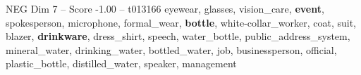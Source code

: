 \begin{textsample}{NEG Dim 7 – Score -1.00 – t013166}  \label{ex:f7_neg_021}
eyewear, glasses, vision\_care, \textbf{event}, spokesperson, microphone, formal\_wear, \textbf{bottle}, white-collar\_worker, coat, suit, blazer, \textbf{drinkware}, dress\_shirt, speech, water\_bottle, public\_address\_system, mineral\_water, drinking\_water, bottled\_water, job, businessperson, official, plastic\_bottle, distilled\_water, speaker, management

\end{textsample}
